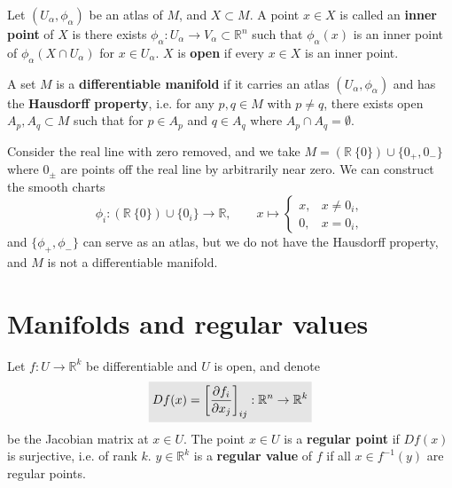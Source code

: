 \documentclass[letter-paper]{tufte-book}
\newenvironment{example}[1][Example]{\begin{trivlist}
\item[\hskip \labelsep {\bfseries #1}]}{\end{trivlist}}
\newcommand{\highlight}[1]{\mathchoice%
  {\colorbox{black!10}{$\displaystyle#1$}}%
  {\colorbox{black!10}{$\textstyle#1$}}%
  {\colorbox{black!10}{$\scriptstyle#1$}}%
  {\colorbox{black!10}{$\scriptscriptstyle#1$}}}%
\begin{document}
Let $(U_\alpha, \phi_\alpha)$ be an atlas of $M$, and $X \subset M$. A point $x \in X$ is called an \textbf{inner point} of $X$ is there exists $\phi_\alpha : U_\alpha \to V_\alpha \subset \mathbb{R}^n$ such that $\phi_\alpha(x)$ is an inner point of $\phi_\alpha (X \cap U_\alpha)$ for $x \in U_\alpha$. $X$ is \textbf{open} if every $x \in X$ is an inner point.

A set $M$ is a \textbf{differentiable manifold} if it carries an atlas $(U_\alpha, \phi_\alpha)$ and has the \textbf{Hausdorff property}, i.e. for any $p, q \in M$ with $p \neq q$, there exists open $A_p, A_q \subset M$ such that for $p \in A_p$ and $q \in A_q$ where $A_p \cap A_q = \emptyset$.

\begin{example}
  Consider the real line with zero removed, and we take $M = (\mathbb{R} \ \{0\}) \cup \{0_+, 0_-\}$ where $0_\pm$ are points off the real line by arbitrarily near zero. We can construct the smooth charts
  \begin{equation*}
    \phi_i : (\mathbb{R} \ \{0\}) \cup \{0_i\} \to \mathbb{R}, \qquad x \mapsto \begin{cases}x, & x \neq 0_i, \\ 0, & x=0_i,\end{cases}
  \end{equation*}
  and $\{\phi_+, \phi_-\}$ can serve as an atlas, but we do not have the Hausdorff property, and $M$ is not a differentiable manifold.
\end{example}


\section{Manifolds and regular values}

Let $f : U \to \mathbb{R}^k$ be differentiable and $U$ is open, and denote
\begin{equation}
  \highlight{Df(x) = \left[\frac{\partial f_i}{\partial x_j}\right]_{ij} : \mathbb{R}^n \to \mathbb{R}^k}
\end{equation}
be the Jacobian matrix at $x \in U$. The point $x \in U$ is a \textbf{regular point} if $Df(x)$ is surjective, i.e. of rank $k$. $y \in \mathbb{R}^k$ is a \textbf{regular value} of $f$ if all $x \in f^{-1}(y)$ are regular points.
\end{document}
